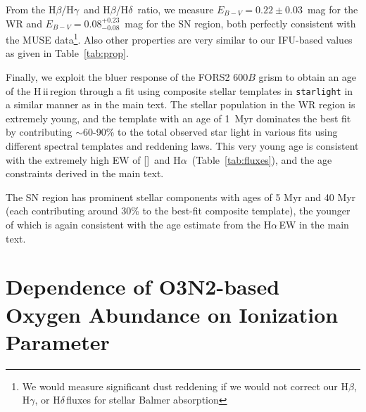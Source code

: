 \documentclass[traditabstract]{aa}
\newcommand{\hb}{H$\beta$}
\newcommand{\ha}{H$\alpha$}
\newcommand{\hg}{H$\gamma$}
\newcommand{\hd}{H$\delta$}
\newcommand{\hii}{\mbox{H\,{\sc ii}}}
\newcommand{\oiii}{[\ion{O}{iii}]}
\begin{document}
\begin{appendix}
From the \hb/\hg\, and \hb/\hd\, ratio, we measure $E_{B-V}=0.22\pm0.03$~mag for the WR and $E_{B-V}=0.08_{-0.08}^{+0.23}$~mag for the SN region, both perfectly consistent with the MUSE data\footnote{We would measure significant dust reddening if we would not correct our \hb, \hg, or \hd\,fluxes for stellar Balmer absorption}. Also other properties are very similar to our IFU-based values as given in Table~\ref{tab:prop}.

Finally, we exploit the bluer response of the FORS2 600$B$ grism to obtain an age of the \hii\,region through a fit using composite stellar templates in \texttt{starlight} in a similar manner as in the main text. The stellar population in the WR region is extremely young, and the \citet{2003MNRAS.344.1000B} template with an age of 1~Myr dominates the best fit by contributing $\sim$60-90\% to the total observed star light in various fits using different spectral templates and reddening laws. This very young age is consistent with the extremely high EW of \oiii\, and \ha\, (Table~\ref{tab:fluxes}), and the age constraints derived in the main text.

The SN region has prominent stellar components with ages of 5 Myr and 40 Myr (each contributing around 30\% to the best-fit composite template), the younger of which is again consistent with the age estimate from the \ha\,EW in the main text.

\section{Dependence of O3N2-based Oxygen Abundance on Ionization Parameter}
\label{sec:abundancevsion}


\end{appendix}
\end{document}
